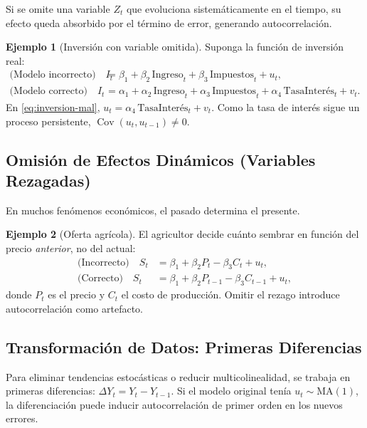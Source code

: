 \documentclass[12pt,a4paper]{article}
\theoremstyle{definition}
\newtheorem{ejemplo}{Ejemplo}[section]
\theoremstyle{remark}
\begin{document}
Si se omite una variable $Z_t$ que evoluciona sistemáticamente en el tiempo,
su efecto queda absorbido por el término de error, generando autocorrelación.

\begin{ejemplo}[Inversión con variable omitida]
  Suponga la función de inversión real:
  \begin{align}
    \text{(Modelo incorrecto)}\quad
    I_t &= \beta_1 + \beta_2\,\text{Ingreso}_t
           + \beta_3\,\text{Impuestos}_t + u_t, \label{eq:inversion-mal}\\
    \text{(Modelo correcto)}\quad
    I_t &= \alpha_1 + \alpha_2\,\text{Ingreso}_t
           + \alpha_3\,\text{Impuestos}_t
           + \alpha_4\,\text{TasaInterés}_t + v_t. \label{eq:inversion-bien}
  \end{align}
  En \eqref{eq:inversion-mal}, $u_t = \alpha_4\,\text{TasaInterés}_t + v_t$.
  Como la tasa de interés sigue un proceso persistente,
  $\operatorname{Cov}(u_t, u_{t-1}) \neq 0$.
\end{ejemplo}

\subsection{Omisión de Efectos Dinámicos (Variables Rezagadas)}

En muchos fenómenos económicos, el pasado determina el presente.

\begin{ejemplo}[Oferta agrícola]
  El agricultor decide cuánto sembrar en función del precio
  \emph{anterior}, no del actual:
  \begin{align*}
    \text{(Incorrecto)}\quad
    S_t &= \beta_1 + \beta_2 P_t - \beta_3 C_t + u_t,\\
    \text{(Correcto)}\quad
    S_t &= \beta_1 + \beta_2 P_{t-1} - \beta_3 C_{t-1} + u_t,
  \end{align*}
  donde $P_t$ es el precio y $C_t$ el costo de producción. Omitir el
  rezago introduce autocorrelación como artefacto.
\end{ejemplo}

\subsection{Transformación de Datos: Primeras Diferencias}

Para eliminar tendencias estocásticas o reducir multicolinealidad, se
trabaja en primeras diferencias:
$\Delta Y_t = Y_t - Y_{t-1}$. Si el modelo original tenía $u_t \sim
\text{MA}(1)$, la diferenciación puede inducir autocorrelación de
primer orden en los nuevos errores.
\end{document}
